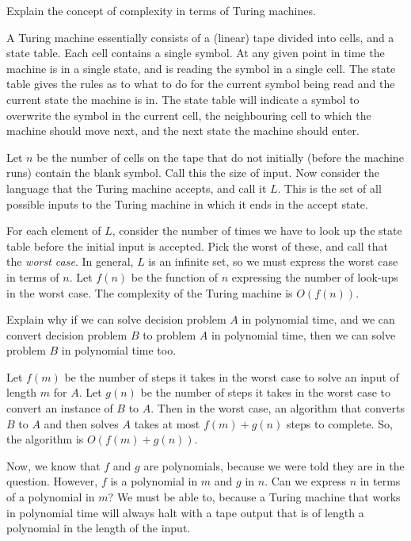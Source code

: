 \documentclass[a4paper, 12pt]{exam}
\begin{document}
\begin{questions}
\question
  Explain the concept of complexity in terms of Turing machines.
  \begin{solution}
    A Turing machine essentially consists of a (linear) tape divided into cells, and a state table.
    Each cell contains a single symbol.
    At any given point in time the machine is in a single state, and is reading the symbol in a single cell.
    The state table gives the rules as to what to do for the current symbol being read and the current state the machine is in.
    The state table will indicate a symbol to overwrite the symbol in the current cell, the neighbouring cell to which the machine should move next, and the next state the machine should enter.

    Let $n$ be the number of cells on the tape that do not initially (before the machine runs) contain the blank symbol.
    Call this the size of input.
    Now consider the language that the Turing machine accepts, and call it $L$.
    This is the set of all possible inputs to the Turing machine in which it ends in the accept state.
    
    For each element of $L$, consider the number of times we have to look up the state table before the initial input is accepted.
    Pick the worst of these, and call that the \emph{worst case}.
    In general, $L$ is an infinite set, so we must express the worst case in terms of $n$.
    Let $f(n)$ be the function of $n$ expressing the number of look-ups in the worst case.
    The complexity of the Turing machine is $O(f(n))$.
  \end{solution}

\question
  Explain why if we can solve decision problem $A$ in polynomial time, and we can convert decision problem $B$ to problem $A$ in polynomial time, then we can solve problem $B$ in polynomial time too.
  \begin{solution}
    Let $f(m)$ be the number of steps it takes in the worst case to solve an input of length $m$ for $A$.
    Let $g(n)$ be the number of steps it takes in the worst case to convert an instance of $B$ to $A$.
    Then in the worst case, an algorithm that converts $B$ to $A$ and then solves $A$ takes at most $f(m)+g(n)$ steps to complete.
    So, the algorithm is $O(f(m)+g(n))$.

    Now, we know that $f$ and $g$ are polynomials, because we were told they are in the question.
    However, $f$ is a polynomial in $m$ and $g$ in $n$.
    Can we express $n$ in terms of a polynomial in $m$?
    We must be able to, because a Turing machine that works in polynomial time will always halt with a tape output that is of length a polynomial in the length of the input. 
  \end{solution}

\end{questions}




\end{document}
